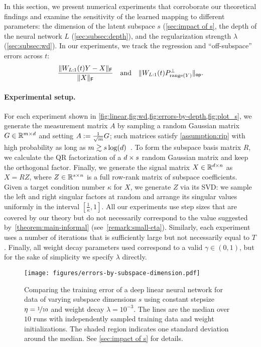 In this section, we present numerical experiments that corroborate our theoretical findings
and examine the sensitivity of the learned mapping to different parameters: the dimension of the latent subspace $s$ (\cref{sec:impact of s}, the depth of the neural network $L$ (\cref{sec:subsec:depth}),
and the regularization strength $\lambda$ (\cref{sec:subsec:wd}).
In our experiments, we track the regression and ``off-subspace''
errors across $t$:
\[
    \frac{\lVert W_{L:1}(t) Y - X\rVert_{\mathsf{F}}}{\lVert X\rVert_{\mathsf{F}}}
    \quad \text{and} \quad
    \lVert W_{L:1}(t) P_{\mathrm{range}(Y)}^{\perp}\rVert_{\mathsf{op}}.
\]
\paragraph{Experimental setup.}
For each experiment shown in \cref{fig:linear,fig:wd,fig:errors-by-depth,fig:plot_s}, we generate the measurement matrix $A$ by sampling a random
Gaussian matrix $G \in \mathbb{R}^{m \times d}$ and setting 
$A := \frac{1}{\sqrt{m}} G$; such matrices satisfy
\cref{assumption:rip} with high probability as long as
$m \gtrsim s \log(d)$~\cite{foucart2013invitation}.
To form the subspace basis matrix $R$, we
calculate the QR factorization of a $d \times s$ random Gaussian matrix and keep the orthogonal factor. 
Finally, we generate the signal matrix
$X \in \mathbb{R}^{d \times n}$ as $X = RZ$, where $Z
\in \mathbb{R}^{s \times n}$ is a full row-rank matrix of
subspace coefficients. Given a target condition number
$\kappa$ for $X$, we generate $Z$ via its SVD: we sample
the left and right singular factors at random and arrange
its singular values uniformly in the interval $[\frac{1}{\kappa}, 1]$. All our experiments use step sizes that
are covered by our theory but do not necessarily correspond to the value suggested by~\cref{theorem:main-informal} (see~\cref{remark:small-eta}). Similarly, each experiment uses a number of iterations that is sufficiently large but not necessarily equal to $T$. Finally, all weight decay parameters used correspond to a valid
$\gamma \in (0, 1)$, but for the sake of simplicity we
specify $\lambda$ directly.

\begin{figure}[h]
    \centering
    \texttt{[image: figures/errors-by-subspace-dimension.pdf]}
    \caption{Comparing the training error of a deep linear neural network for data of varying subspace dimensions $s$ using constant stepsize $\eta = \nicefrac{1}{10}$ and
    weight decay $\lambda = 10^{-3}$. The lines are the median over $10$ runs with independently sampled training data and weight initializations. The shaded region indicates one standard deviation around the median. 
    See \cref{sec:impact of s} for details.
    }
    \label{fig:plot_s}
\end{figure}

